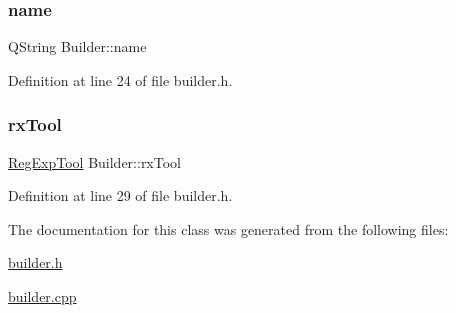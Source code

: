 \subsubsection{\texorpdfstring{name}{name}}
{\footnotesize\ttfamily Q\+String Builder\+::name\hspace{0.3cm}{\ttfamily [protected]}}



Definition at line 24 of file builder.\+h.

\mbox{\label{class_builder_a87575206ceba9ffc2d5c70c5800fff18}} 
\subsubsection{\texorpdfstring{rx\+Tool}{rxTool}}
{\footnotesize\ttfamily \hyperlink{class_reg_exp_tool}{Reg\+Exp\+Tool} Builder\+::rx\+Tool\hspace{0.3cm}{\ttfamily [protected]}}



Definition at line 29 of file builder.\+h.



The documentation for this class was generated from the following files\+:\begin{DoxyCompactItemize}
\item 
\hyperlink{builder_8h}{builder.\+h}\item 
\hyperlink{builder_8cpp}{builder.\+cpp}\end{DoxyCompactItemize}
